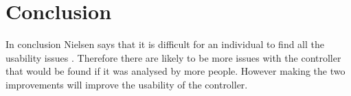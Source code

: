 \documentclass{scrartcl}
\begin{document}
\section{Conclusion}
In conclusion Nielsen says that it is difficult for an individual to find all the usability issues  \cite{HeuristicEvaluation}. Therefore there are likely to be more issues with the controller that would be found if it was analysed by more people. However making the two improvements will improve the usability of the controller.



	
\end{document}
